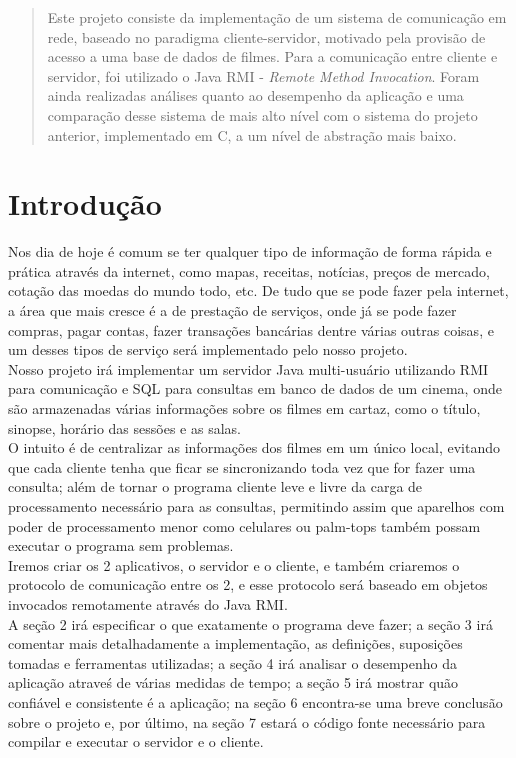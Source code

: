 \documentclass[11pt,twoside]{article}
\begin{document}
\begin{abstract}
Este projeto consiste da implementação de um sistema de comunicação em rede, baseado no paradigma cliente-servidor, motivado pela provisão de acesso a uma base de dados de filmes. Para a comunicação entre cliente e servidor, foi utilizado o Java RMI - \textit{Remote Method Invocation}. Foram ainda realizadas análises quanto ao desempenho da aplicação e uma comparação desse sistema de mais alto nível com o sistema do projeto anterior, implementado em C, a um nível de abstração mais baixo.
\end{abstract}

\section{Introdução}
Nos dia de hoje é comum se ter qualquer tipo de informação de forma rápida e prática através da internet, como mapas, receitas, notícias, preços de mercado, cotação das moedas do mundo todo, etc. De tudo que se pode fazer pela internet, a área que mais cresce é a de prestação de serviços, onde já se pode fazer compras, pagar contas, fazer transações bancárias dentre várias outras coisas, e um desses tipos de serviço será implementado pelo nosso projeto.\\
Nosso projeto irá implementar um servidor Java multi-usuário utilizando RMI para comunicação e SQL para consultas em banco de dados de um cinema, onde são armazenadas várias informações sobre os filmes em cartaz, como o título, sinopse, horário das sessões e as salas.\\
O intuito é de centralizar as informações dos filmes em um único local, evitando que cada cliente tenha que ficar se sincronizando toda vez que for fazer uma consulta; além de tornar o programa cliente leve e livre da carga de processamento necessário para as consultas, permitindo assim que aparelhos com poder de processamento menor como celulares ou palm-tops também possam executar o programa sem problemas.\\
Iremos criar os 2 aplicativos, o servidor e o cliente, e também criaremos o protocolo de comunicação entre os 2, e esse protocolo será baseado em objetos invocados remotamente através do Java RMI.\\
A seção 2 irá especificar o que exatamente o programa deve fazer; a seção 3 irá comentar mais detalhadamente a implementação, as definições, suposições tomadas e ferramentas utilizadas; a seção 4 irá analisar o desempenho da aplicação atraveś de várias medidas de tempo; a seção 5 irá mostrar quão confiável e consistente é a aplicação; na seção 6 encontra-se uma breve conclusão sobre o projeto e, por último, na seção 7 estará o código fonte necessário para compilar e executar o servidor e o cliente.
\end{document}
